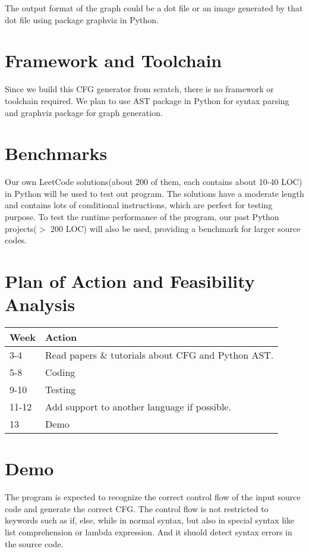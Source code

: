 \documentclass[11pt]{article}
\begin{document}
The output format of the graph could be a dot file or an image generated by that dot file using package graphviz in Python.

\section{Framework and Toolchain}\label{section-framework}
Since we build this CFG generator from scratch, there is no framework or toolchain required. We plan to use AST package in Python for syntax parsing and graphviz package for graph generation.

\section{Benchmarks}\label{section-benchmarks}
Our own LeetCode solutions(about 200 of them, each contains about 10-40 LOC) in Python will be used to test out program. The solutions have a moderate length and contains lots of conditional instructions, which are perfect for testing purpose. To test the runtime performance of the program, our past Python projects($>$ 200 LOC) will also be used, providing a benchmark for larger source codes.

\section{Plan of Action and Feasibility Analysis}\label{section-plan}
\begin{tabular}{| l | l |}
\hline
Week & Action  \\ \hline
3-4 & Read papers \& tutorials about CFG and Python AST.  \\ \hline
5-8 & Coding  \\ \hline
9-10 & Testing  \\ \hline
11-12 & Add support to another language if possible.  \\ \hline
13 & Demo  \\ \hline
\end{tabular}

\section{Demo}\label{section-demo}
The program is expected to recognize the correct control flow of the input source code and generate the correct CFG. The control flow is not restricted to keywords such as if, else, while in normal syntax, but also in special syntax like list comprehension or lambda expression. And it shuold detect syntax errors in the source code.
\end{document}
